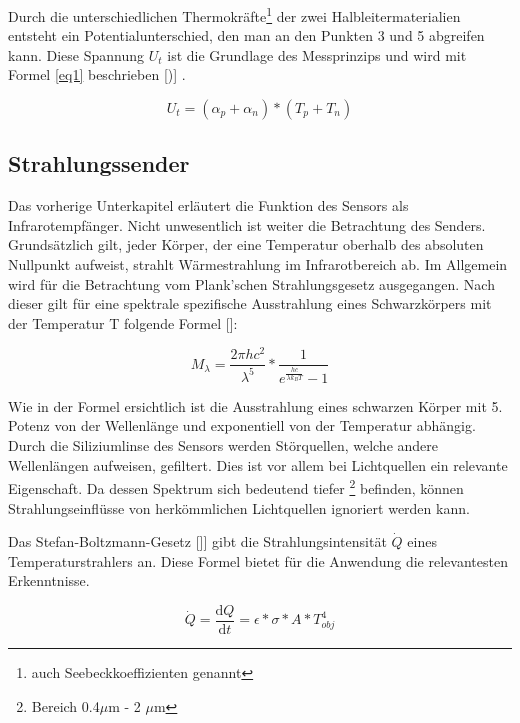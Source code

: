 Durch die unterschiedlichen Thermokräfte\footnote[3]{auch Seebeckkoeffizienten genannt} der zwei Halbleitermaterialien entsteht ein Potentialunterschied, den man an den Punkten 3 und 5 abgreifen kann. Diese Spannung $U_{t}$ ist die Grundlage des Messprinzips und wird mit Formel \ref{eq1} beschrieben [)\protect\cite{AMG8834}] .

\begin{equation}
\label{eq1}
U_{t} = (\alpha_{p} + \alpha_{n})*(T_{p}+T_{n})
\end{equation}

\subsection{Strahlungssender}
\label{subsec:Strahlungstheorie}
Das vorherige Unterkapitel erläutert die Funktion des Sensors als Infrarotempfänger. Nicht unwesentlich ist weiter die Betrachtung des Senders. Grundsätzlich gilt, jeder Körper, der eine Temperatur oberhalb des absoluten Nullpunkt aufweist, strahlt Wärmestrahlung im Infrarotbereich ab. Im Allgemein wird für die Betrachtung vom Plank'schen Strahlungsgesetz ausgegangen. Nach dieser gilt für eine spektrale spezifische Ausstrahlung eines Schwarzkörpers mit der Temperatur T folgende Formel [\protect\cite{Thermoformeln}]: 

\begin{equation}
\label{eq2}
M_{\lambda } = \frac{2\pi h c^2 }{\lambda^5}*\frac{1}{e^\frac{hc}{\lambda k_{B} T}-1}
\end{equation}

Wie in der Formel ersichtlich ist die Ausstrahlung eines schwarzen Körper mit 5. Potenz von der Wellenlänge und exponentiell von der Temperatur abhängig. Durch die Siliziumlinse des Sensors werden Störquellen, welche andere Wellenlängen aufweisen, gefiltert. Dies ist vor allem bei Lichtquellen ein relevante Eigenschaft. Da dessen Spektrum sich bedeutend tiefer \footnote[4]{Bereich 0.4$\mu$m - 2 $\mu$m} befinden, können Strahlungseinflüsse von herkömmlichen Lichtquellen ignoriert werden kann.

Das Stefan-Boltzmann-Gesetz []\protect\cite{Thermoformeln}] gibt die Strahlungsintensität $\dot{Q}$ eines Temperaturstrahlers an. Diese Formel bietet für die Anwendung die relevantesten Erkenntnisse.

\begin{equation}
\label{eq3}
\dot{Q} = \frac{\mathrm{d} Q}{\mathrm{d} t} = \epsilon *\sigma * A * T_{obj}^4
\end{equation}

